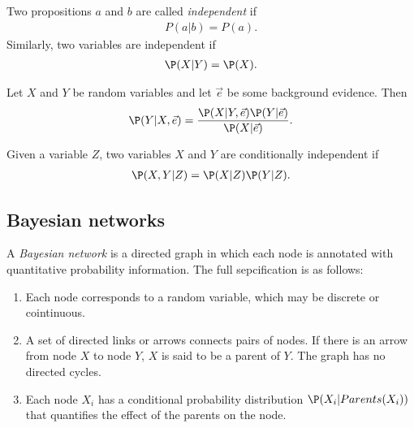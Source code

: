 \documentclass{article}
\begin{document}
\begin{definition}
    Two propositions $a$ and $b$ are called \emph{independent} if
    \begin{align*}
        P(a|b) = P(a).
    \end{align*}
    Similarly, two variables are independent if
    \begin{align*}
        \P(X|Y) = \P(X).
    \end{align*}
\end{definition}

\begin{theorem}
    Let $X$ and $Y$ be random variables and let $\vec e$ be some
    background evidence. Then
    \begin{align*}
        \P(Y|X,\vec e) = \frac{\P(X|Y,\vec e)\P(Y|\vec e)}{\P(X|\vec e)}.
    \end{align*}
\end{theorem}

\begin{definition}
    Given a variable $Z$, two variables $X$ and $Y$ are conditionally independent
    if
    \begin{align*}
        \P(X,Y|Z) = \P(X|Z)\P(Y|Z).
    \end{align*}
\end{definition}

\subsection{Bayesian networks}

\begin{definition}
    A \emph{Bayesian network} is a directed graph in which each node is
    annotated with quantitative probability information. The full sepcification
    is as follows:
    \begin{enumerate}
        \item Each node corresponds to a random variable, which may be discrete or cointinuous.
        \item A set of directed links or arrows connects pairs of nodes. If there is an arrow
        from node $X$ to node $Y$, $X$ is said to be a parent of $Y$. The graph has no directed cycles.
        \item Each node $X_i$ has a conditional probability distribution $\P(X_i|Parents(X_i))$ that 
         quantifies the effect of the parents on the node.
    \end{enumerate}
\end{definition}
\end{document}
